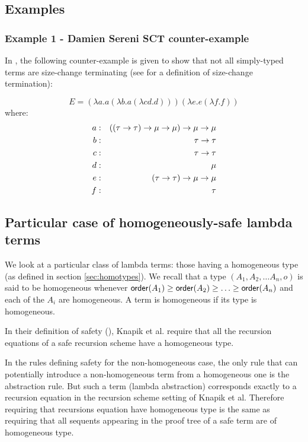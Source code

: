 \subsection{Examples}

\subsubsection{Example 1 - Damien Sereni SCT counter-example}
In \cite{serenistypesct05}, the following counter-example is given
to show that not all simply-typed terms are size-change terminating
(see \cite{jones01} for a definition of size-change termination):

$$ E =  (\lambda a . a (\lambda b . a (\lambda c d .d))) (\lambda e . e (\lambda f .f))$$
where:
\begin{eqnarray*}
a &:& ((\tau \rightarrow \tau) \rightarrow \mu \rightarrow \mu) \rightarrow \mu \rightarrow \mu \\
b &:& \tau \rightarrow \tau \\
c &:& \tau \rightarrow \tau \\
d &:& \mu \\
e &:& (\tau \rightarrow \tau) \rightarrow \mu \rightarrow \mu \\
f &:& \tau
\end{eqnarray*}




\subsection{Particular case of homogeneously-safe lambda terms}

We look at a particular class of lambda terms: those having a
homogeneous type (as defined in section \ref{sec:homotypes}). We
recall that a type $(A_1, A_2, \ldots A_n, o)$ is said to be
homogeneous whenever ${\sf order}(A_1) \geq {\sf order}(A_2) \geq \ldots \geq
{\sf order}(A_n)$ and each of the $A_i$ are homogeneous. A term is
homogeneous if its type is homogeneous.


In their definition of safety (\cite{KNU02}), Knapik et al. require
that all the recursion equations of a safe recursion scheme have a
homogeneous type.

In the rules defining safety for the non-homogeneous case, the only
rule that can potentially introduce a non-homogeneous term from a
homogeneous one is the abstraction rule. But such a term (lambda
abstraction) corresponds exactly to a recursion equation in the
recursion scheme setting of Knapik et al. Therefore requiring that
recursions equation have homogeneous type is the same as requiring
that all sequents appearing in the proof tree of a safe term are of
homogeneous type.

